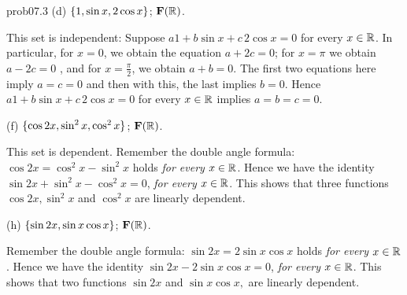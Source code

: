 \begin{sol}{prob07.3}
(d)  $\{1, \sin x, 2 \cos x \}$;  $\mathbf{F}(\mathbb{R})$.

\soln This set is independent: Suppose $a1 + b\sin x +c\, 2 \cos x=0$ for  every $x\in \mathbb{R}$. In particular, for $x=0$, we obtain the equation $a+ 2c=0$; for $x=\pi$ we obtain $a- 2c=0$ , and for $x=\frac{\pi}2$, we obtain $a+b=0$. The first two equations here imply $a=c=0$ and then with this, the last implies $b=0$. Hence $a1 + b\sin x +c\, 2 \cos x=0$ for  every $x\in \mathbb{R}$ implies $a=b=c=0$.
 \medskip  

(f)  $\{\cos 2x, \sin^2 x,  \cos^2 x \}$;  $\mathbf{F}(\mathbb{R})$.

\soln This set is dependent. Remember the double angle formula: $\cos 2x= \cos^2x -\sin^2 x$ holds {\it for every $x\in \mathbb{R}$}. Hence we have the identity $\sin 2x + \sin^2 x  -\cos^2 x=0$, {\it for  every $x\in \mathbb{R}$}. This shows that three functions $\cos 2x, \sin^2 x$ and  $\cos^2 x$ are linearly dependent.

 \medskip  

(h)  $\{\sin 2x, \sin x \cos x  \}$;  $\mathbf{F}(\mathbb{R})$. 

\soln Remember the double angle formula: $\sin 2x= 2\sin x \cos x$ holds {\it for every $x\in \mathbb{R}$}. Hence we have the identity $\sin 2x -2 \sin x \cos x=0$, {\it for  every $x\in \mathbb{R}$}. This shows that two functions $\sin 2x$ and $ \sin x \cos x,$  are linearly dependent.



\end{sol}


